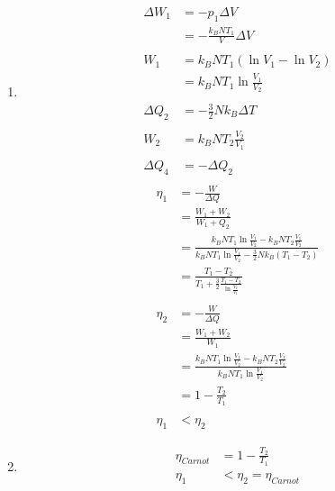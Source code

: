 \documentclass[11pt,letterpaper]{article}
\begin{document}
\begin{enumerate}
\begin{enumerate}
            \item 
            \begin{align*}
                \Delta W_1 &= -p_1 \Delta V\\
                &= -\frac{k_B N T_1}{V} \Delta V\\
                \\
                W_1 &= k_B N T_1 (\ln {V_1} - \ln{V_2}) \\
                &= k_B N T_1 \ln {\frac{V_1}{V_2}} \\
                \\
                \Delta Q _2 &= -\frac{3}{2}N k_B \Delta T \\
                \\
                W_2 &= k_B N T_2  {\frac{V_2}{V_1}} \\
                \\
                \Delta Q _4 &= - \Delta Q_2 \\
                \end{align*}
                \begin{align*}
                \eta_1 &= -\frac{W}{\Delta Q}\\
                &= \frac{W_1 + W_2}{W_1 + Q_2}\\
                &= \frac{k_B N T_1 \ln {\frac{V_1}{V_2}} - k_B N T_2  {\frac{V_1}{V_2}}}
                {k_B N T_1 \ln {\frac{V_1}{V_2}} - \frac{3}{2} N k_B (T_1 -T_2)}\\
                &= \frac{  T_1  -T_2 }
                {T_1  + \frac{3}{2} \frac{T_1 - T_2}{\ln {\frac{V_2}{V_1}}}}\\
                \\
                \eta_2 &= -\frac{W}{\Delta Q}\\
                &= \frac{W_1 + W_2}{W_1}\\
                &= \frac{k_B N T_1 \ln {\frac{V_1}{V_2}} - k_B N T_2  {\frac{V_1}{V_2}}}
                {k_B N T_1 \ln {\frac{V_1}{V_2}}}\\
                &= 1 - \frac{T_2}{T_1}\\
                \\
                \eta _1  &< \eta_2
            \end{align*}

            \item 
            \begin{align*}
                \eta_{Carnot} &=  1 - \frac{T_2}{T_1}\\
                \eta _1  &< \eta_2 = \eta_{Carnot}\\
            \end{align*}
            
        \end{enumerate}
\end{enumerate}
\end{document}
